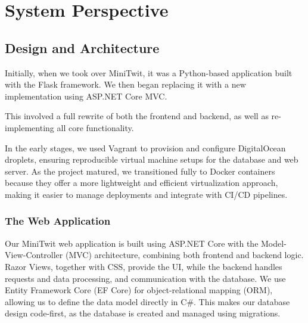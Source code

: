 \documentclass[12pt,a4paper,reqno]{report}
\begin{document}
 
\clearpage
\tableofcontents

\setcounter{page}{0}
\clearpage


\section{System Perspective}

\subsection{Design and Architecture}


Initially, when we took over MiniTwit, it was a Python-based application built with the Flask framework. We then began replacing it with a new implementation using ASP.NET Core MVC. 

This involved a full rewrite of both the frontend and backend, as well as re-implementing all core functionality.

In the early stages, we used Vagrant to provision and configure DigitalOcean droplets, ensuring reproducible virtual machine setups for the database and web server. As the project matured, we transitioned fully to Docker containers because they offer a more lightweight and efficient virtualization approach, making it easier to manage deployments and integrate with CI/CD pipelines.

\subsubsection{The Web Application}
Our MiniTwit web application is built using ASP.NET Core with the Model-View-Controller (MVC) architecture, combining both frontend and backend logic. Razor Views, together with CSS, provide the UI, while the backend handles requests and data processing, and communication with the database. We use Entity Framework Core (EF Core) for object-relational mapping (ORM), allowing us to define the data model directly in C\#. This makes our database design code-first, as the database is created and managed using migrations.
\end{document}
